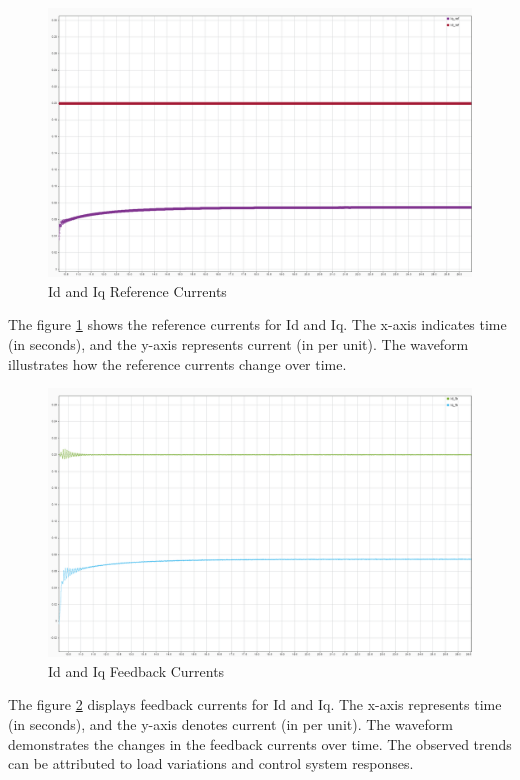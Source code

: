 \begin{figure}[H]
	\centering
	\includegraphics[width=6in]{sections/section3/images/simulationResutls/Id_ref_Iq_ref.png}
	\caption{Id and Iq Reference Currents}
	\label{fig:current_response_Id_ref_Iq_ref}
\end{figure}

The figure \ref{fig:current_response_Id_ref_Iq_ref} shows the reference currents for Id and Iq. The x-axis indicates time (in seconds), and the y-axis represents current (in per unit). The waveform illustrates how the reference currents change over time.


\begin{figure}[H]
	\centering
	\includegraphics[width=6in]{sections/section3/images/simulationResutls/Id_fb_Iq_fb.png}
	\caption{Id and Iq Feedback Currents}
	\label{fig:current_response_Id_fb_Iq_fb}
\end{figure}


The figure \ref{fig:current_response_Id_fb_Iq_fb} displays feedback currents for Id and Iq. The x-axis represents time (in seconds), and the y-axis denotes current (in per unit). The waveform demonstrates the changes in the feedback currents over time. The observed trends can be attributed to load variations and control system responses.


